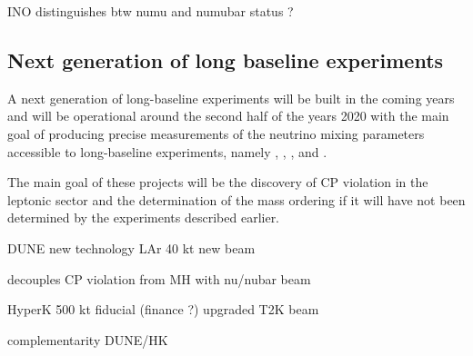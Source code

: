 INO distinguishes btw numu and numubar status ? 


\subsection{Next generation of long baseline experiments}
A next generation of long-baseline experiments will be built in the coming years and will be operational around the second half of the years 2020 with the main goal of producing precise measurements of the neutrino mixing parameters accessible to long-baseline experiments, namely \thatm, \thint, \dmsq, and \dcp. 

The main goal of these projects will be the discovery of CP violation in the leptonic sector and the determination of the mass ordering if it will have not been determined by the experiments described earlier. 





DUNE new technology LAr 40 kt new beam

decouples CP violation from MH with nu/nubar beam

HyperK 500 kt fiducial (finance ?) upgraded T2K beam

complementarity DUNE/HK